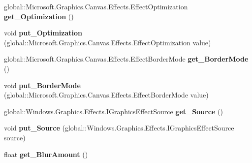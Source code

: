 \begin{DoxyCompactItemize}
global\+::\+Microsoft.\+Graphics.\+Canvas.\+Effects.\+Effect\+Optimization {\bfseries get\+\_\+\+Optimization} ()
\item 
\mbox{\label{interface_microsoft_1_1_graphics_1_1_canvas_1_1_effects_1_1_i_gaussian_blur_effect_a9ea1c87990030f61d07b28648580ea03}} 
void {\bfseries put\+\_\+\+Optimization} (global\+::\+Microsoft.\+Graphics.\+Canvas.\+Effects.\+Effect\+Optimization value)
\item 
\mbox{\label{interface_microsoft_1_1_graphics_1_1_canvas_1_1_effects_1_1_i_gaussian_blur_effect_a9070edd9d76886803e481852cc79fe7a}} 
global\+::\+Microsoft.\+Graphics.\+Canvas.\+Effects.\+Effect\+Border\+Mode {\bfseries get\+\_\+\+Border\+Mode} ()
\item 
\mbox{\label{interface_microsoft_1_1_graphics_1_1_canvas_1_1_effects_1_1_i_gaussian_blur_effect_a206e8f9a37a96c96af289283beac798d}} 
void {\bfseries put\+\_\+\+Border\+Mode} (global\+::\+Microsoft.\+Graphics.\+Canvas.\+Effects.\+Effect\+Border\+Mode value)
\item 
\mbox{\label{interface_microsoft_1_1_graphics_1_1_canvas_1_1_effects_1_1_i_gaussian_blur_effect_a843c2c9b086f2e10542ae9aa2b39a3f6}} 
global\+::\+Windows.\+Graphics.\+Effects.\+I\+Graphics\+Effect\+Source {\bfseries get\+\_\+\+Source} ()
\item 
\mbox{\label{interface_microsoft_1_1_graphics_1_1_canvas_1_1_effects_1_1_i_gaussian_blur_effect_a366b87bbdd12c4d7eeb1c50ae1c56d3d}} 
void {\bfseries put\+\_\+\+Source} (global\+::\+Windows.\+Graphics.\+Effects.\+I\+Graphics\+Effect\+Source source)
\item 
\mbox{\label{interface_microsoft_1_1_graphics_1_1_canvas_1_1_effects_1_1_i_gaussian_blur_effect_a88a386d562a3ed84bdcebfeffa5d35c0}} 
float {\bfseries get\+\_\+\+Blur\+Amount} ()

\end{DoxyCompactItemize}
